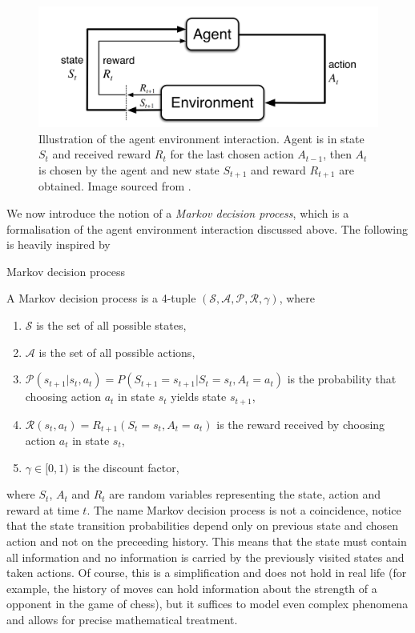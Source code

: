 \begin{figure}
  \includegraphics[width=\linewidth]{../img/agent_environment_interaction.png}
  \caption{Illustration of the agent environment interaction. Agent is in state $S_t$ and received reward $R_t$ for the last chosen action $A_{t-1}$, then $A_t$ is chosen by the agent and new state $S_{t+1}$ and reward $R_{t+1}$ are obtained. Image sourced from \cite[Figure 3.1.]{sutton2018reinforcement}.}
  \label{fig:agent_environment_interaction}
\end{figure}

We now introduce the notion of a \textit{Markov decision process}, which is a formalisation of the agent environment interaction discussed above. The following is heavily inspired by \cite[Chapter 3]{sutton2018reinforcement}
\begin{defn}{Markov decision process}
\cite{sutton2018reinforcement}
\label{defn:markov_decision_process}

A Markov decision process is a 4-tuple $(\mathcal{S}, \mathcal{A}, \mathcal{P}, \mathcal{R}, \gamma)$, where 
\begin{enumerate}
\item $\mathcal{S}$ is the set of all possible states,
\item $\mathcal{A}$ is the set of all possible actions,
\item $\mathcal{P}(s_{t+1}|s_{t},a_t)=P(S_{t+1}=s_{t+1}|S_t=s_{t},A_t=a_t)$ is the probability that choosing action $a_t$ in state $s_t$ yields state $s_{t+1}$,
\item $\mathcal{R}(s_t, a_t)=R_{t+1}(S_t=s_t, A_t=a_t)$ is the reward received by choosing action $a_t$ in state $s_t$,
\item $\gamma \in [0,1)$ is the discount factor,

\end{enumerate}
\end{defn}
where $S_t$, $A_t$ and $R_t$ are random variables representing the state, action and reward at time $t$. The name Markov decision process is not a coincidence, notice that the state transition probabilities depend only on previous state and chosen action and not on the preceeding history. This means that the state must contain all information and no information is carried by the previously visited states and taken actions. Of course, this is a simplification and does not hold in real life (for example, the history of moves can hold information about the strength of a opponent in the game of chess), but it suffices to model even complex phenomena and allows for precise mathematical treatment. 

